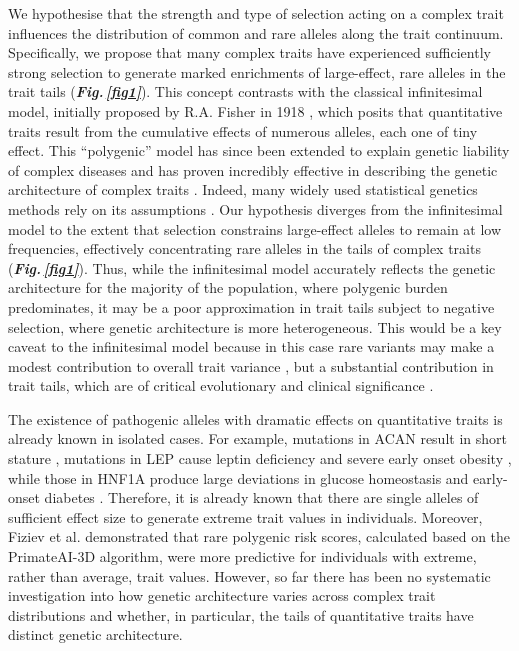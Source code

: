 \documentclass[12pt]{zHenriquesLab-StyleBioRxiv}
\newcommand\fref[1]{\normalsize{\textbf{\textit{Fig.\,\ref{#1}}}}\normalsize{}}
\begin{document}
We hypothesise that the strength and type of selection acting on a complex trait influences 
the distribution of common and rare alleles along the trait continuum. Specifically, we 
propose that many complex traits have experienced sufficiently strong selection to generate 
marked enrichments of large-effect, rare alleles in the trait tails (\fref{fig1}). 
This concept contrasts with the classical infinitesimal model, initially 
proposed by R.A. Fisher in 1918 \cite{Fisher1919} , which posits that quantitative traits result 
from the cumulative effects of numerous alleles, each one of tiny effect. This “polygenic” model has 
since been extended to explain genetic liability of complex diseases and has proven incredibly 
effective in describing the genetic architecture of complex traits \cite{Wray2018,Barton2017}. 
Indeed, many widely used statistical genetics methods rely on its 
assumptions \cite{Yang2011,BulikSullivan2015,Choi2020}. Our hypothesis diverges 
from the infinitesimal model to the extent that selection constrains large-effect alleles 
to remain at low frequencies, effectively concentrating rare alleles in the tails of complex traits (\fref{fig1}). 
Thus, while the infinitesimal model accurately reflects the genetic architecture for the 
majority of the population, where polygenic burden predominates, it may be a poor approximation 
in trait tails subject to negative selection, where genetic architecture is more heterogeneous. 
This would be a key caveat to the infinitesimal model because in this case rare variants may 
make a modest contribution to overall trait variance \cite{Weiner2023}, but a substantial 
contribution in trait tails, which are of critical evolutionary and clinical 
significance \cite{Kingsolver2007,Ference2018,Kyrou2000}. 



The existence of pathogenic alleles with dramatic effects on quantitative 
traits is already known in isolated cases. For example, mutations in ACAN 
result in short stature \cite{vanDerSteen2017}, mutations in LEP cause leptin 
deficiency and severe early onset obesity \cite{Saeed2015}, while those in HNF1A 
produce large deviations in glucose homeostasis and early-onset diabetes \cite{Miyachi2022}. 
Therefore, it is already known that there are single alleles of sufficient effect size 
to generate extreme trait values in individuals. Moreover, Fiziev et al. \cite{Fiziev2023} 
demonstrated that rare polygenic risk scores, calculated based on the PrimateAI-3D algorithm, 
were more predictive for individuals with extreme, rather than average, trait values. 
However, so far there has been no systematic investigation into how genetic architecture varies 
across complex trait distributions and whether, in particular, the tails of quantitative traits have distinct genetic architecture. 
\end{document}
